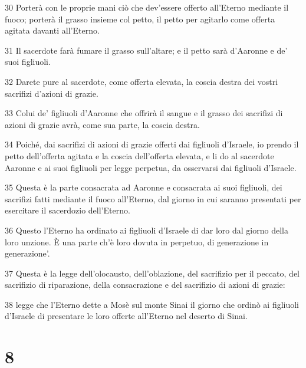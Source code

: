 \par 30 Porterà con le proprie mani ciò che dev'essere offerto all'Eterno mediante il fuoco; porterà il grasso insieme col petto, il petto per agitarlo come offerta agitata davanti all'Eterno.
\par 31 Il sacerdote farà fumare il grasso sull'altare; e il petto sarà d'Aaronne e de' suoi figliuoli.
\par 32 Darete pure al sacerdote, come offerta elevata, la coscia destra dei vostri sacrifizi d'azioni di grazie.
\par 33 Colui de' figliuoli d'Aaronne che offrirà il sangue e il grasso dei sacrifizi di azioni di grazie avrà, come sua parte, la coscia destra.
\par 34 Poiché, dai sacrifizi di azioni di grazie offerti dai figliuoli d'Israele, io prendo il petto dell'offerta agitata e la coscia dell'offerta elevata, e li do al sacerdote Aaronne e ai suoi figliuoli per legge perpetua, da osservarsi dai figliuoli d'Israele.
\par 35 Questa è la parte consacrata ad Aaronne e consacrata ai suoi figliuoli, dei sacrifizi fatti mediante il fuoco all'Eterno, dal giorno in cui saranno presentati per esercitare il sacerdozio dell'Eterno.
\par 36 Questo l'Eterno ha ordinato ai figliuoli d'Israele di dar loro dal giorno della loro unzione. È una parte ch'è loro dovuta in perpetuo, di generazione in generazione'.
\par 37 Questa è la legge dell'olocausto, dell'oblazione, del sacrifizio per il peccato, del sacrifizio di riparazione, della consacrazione e del sacrifizio di azioni di grazie:
\par 38 legge che l'Eterno dette a Mosè sul monte Sinai il giorno che ordinò ai figliuoli d'Israele di presentare le loro offerte all'Eterno nel deserto di Sinai.

\chapter{8}

